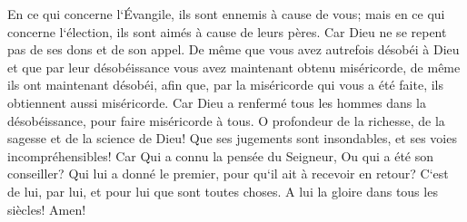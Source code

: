 \verse En ce qui concerne l`Évangile, ils sont ennemis à cause de vous; mais en ce qui concerne l`élection, ils sont aimés à cause de leurs pères. 
\verse Car Dieu ne se repent pas de ses dons et de son appel. 
\verse De même que vous avez autrefois désobéi à Dieu et que par leur désobéissance vous avez maintenant obtenu miséricorde, 
\verse de même ils ont maintenant désobéi, afin que, par la miséricorde qui vous a été faite, ils obtiennent aussi miséricorde. 
\verse Car Dieu a renfermé tous les hommes dans la désobéissance, pour faire miséricorde à tous. 
\verse O profondeur de la richesse, de la sagesse et de la science de Dieu! Que ses jugements sont insondables, et ses voies incompréhensibles! Car 
\verse Qui a connu la pensée du Seigneur, Ou qui a été son conseiller? 
\verse Qui lui a donné le premier, pour qu`il ait à recevoir en retour? 
\verse C`est de lui, par lui, et pour lui que sont toutes choses. A lui la gloire dans tous les siècles! Amen! 

